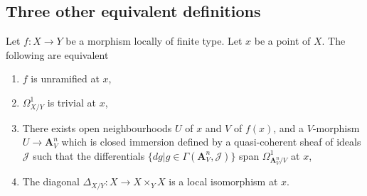 \subsection{Three other equivalent definitions}
\label{subsection-three-other}

\begin{theorem}
\label{theorem-unramified-equivalence}
Let $f:X \to Y$ be a morphism locally of finite type. Let $x$ be a point of
$X$. The following are equivalent
\begin{enumerate}
\item $f$ is unramified at $x$,
\item $\Omega^1_{X/Y}$ is trivial at $x$,
\item There exists open neighbourhoods $U$ of $x$ and $V$ of $f(x)$, and a
$V$-morphism $U \to \mathbf{A}^n_V$ which is closed immersion defined by a
quasi-coherent sheaf of ideals $\mathcal{J}$ such that the differentials
$\{dg | g \in \Gamma(\mathbf{A}^n_V,\mathcal{J})\}$ span $\Omega^1_{\mathbf{A}^n_V/V}$ at $x$,
\item The diagonal $\Delta_{X/Y}:X \to X \times_Y X$ is a local isomorphism at
$x$.
\end{enumerate}
\end{theorem}

